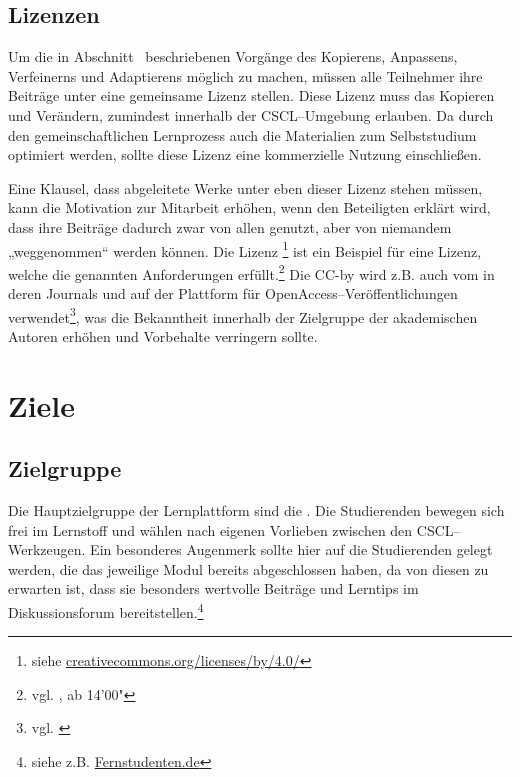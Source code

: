 \subsection{Lizenzen} %
\label{sub:lizenzen}
Um die in Abschnitt~ beschriebenen Vorgänge des Kopierens, Anpassens, Verfeinerns und Adaptierens möglich zu machen, müssen alle Teilnehmer ihre Beiträge unter eine gemeinsame Lizenz stellen. Diese Lizenz muss das Kopieren und Verändern, zumindest innerhalb der \ac{CSCL}–Umgebung erlauben. Da durch den gemeinschaftlichen Lernprozess auch die Materialien zum Selbststudium optimiert werden, sollte diese Lizenz eine kommerzielle Nutzung einschließen. 

Eine Klausel, dass abgeleitete Werke unter eben dieser Lizenz stehen müssen, kann die Motivation zur Mitarbeit erhöhen, wenn den Beteiligten erklärt wird, dass ihre Beiträge dadurch zwar von allen genutzt, aber von niemandem „weggenommen“ werden können. Die Lizenz \footnote{siehe \url{creativecommons.org/licenses/by/4.0/}} ist ein Beispiel für eine Lizenz, welche die genannten Anforderungen erfüllt.\footnote{vgl. \cite{baraniuk}, ab 14'00"} Die \ac{CC-by} wird z.B. auch vom  in deren Journals und auf der Plattform  für OpenAccess–Veröffentlichungen verwendet\footnote{vgl. \cite{springercc}}, was die Bekanntheit innerhalb der Zielgruppe der akademischen Autoren erhöhen und Vorbehalte verringern sollte.



\section{Ziele} %
\label{sec:ziele}

\subsection{Zielgruppe} %
\label{sub:zielgruppe}
Die Hauptzielgruppe der Lernplattform sind die . Die Studierenden bewegen sich frei im Lernstoff und wählen nach eigenen Vorlieben zwischen den CSCL–Werkzeugen. Ein besonderes Augenmerk sollte hier auf die Studierenden gelegt werden, die das jeweilige Modul bereits abgeschlossen haben, da von diesen zu erwarten ist, dass sie besonders wertvolle Beiträge und Lerntips im Diskussionsforum bereitstellen.\footnote{siehe z.B. \url{Fernstudenten.de}}

